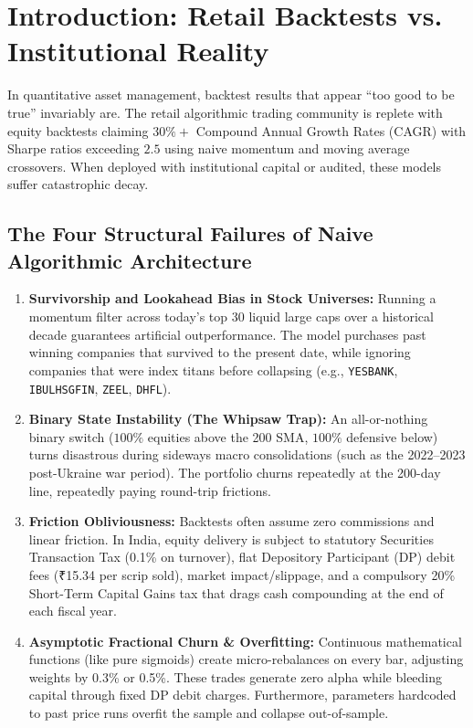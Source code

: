 \documentclass[11pt,a4paper]{article}
\begin{document}
\tableofcontents
\newpage

\section{Introduction: Retail Backtests vs. Institutional Reality}

In quantitative asset management, backtest results that appear ``too good to be true'' invariably are. The retail algorithmic trading community is replete with equity backtests claiming $30\%+$ Compound Annual Growth Rates (CAGR) with Sharpe ratios exceeding $2.5$ using naive momentum and moving average crossovers. When deployed with institutional capital or audited, these models suffer catastrophic decay.

\subsection{The Four Structural Failures of Naive Algorithmic Architecture}
\begin{enumerate}[leftmargin=*]
    \item \textbf{Survivorship and Lookahead Bias in Stock Universes:} Running a momentum filter across today's top 30 liquid large caps over a historical decade guarantees artificial outperformance. The model purchases past winning companies that survived to the present date, while ignoring companies that were index titans before collapsing (e.g., \texttt{YESBANK}, \texttt{IBULHSGFIN}, \texttt{ZEEL}, \texttt{DHFL}).
    \item \textbf{Binary State Instability (The Whipsaw Trap):} An all-or-nothing binary switch ($100\%$ equities above the 200 SMA, $100\%$ defensive below) turns disastrous during sideways macro consolidations (such as the 2022--2023 post-Ukraine war period). The portfolio churns repeatedly at the 200-day line, repeatedly paying round-trip frictions.
    \item \textbf{Friction Obliviousness:} Backtests often assume zero commissions and linear friction. In India, equity delivery is subject to statutory Securities Transaction Tax (0.1\% on turnover), flat Depository Participant (DP) debit fees (₹15.34 per scrip sold), market impact/slippage, and a compulsory 20\% Short-Term Capital Gains tax that drags cash compounding at the end of each fiscal year.
    \item \textbf{Asymptotic Fractional Churn \& Overfitting:} Continuous mathematical functions (like pure sigmoids) create micro-rebalances on every bar, adjusting weights by 0.3\% or 0.5\%. These trades generate zero alpha while bleeding capital through fixed DP debit charges. Furthermore, parameters hardcoded to past price runs overfit the sample and collapse out-of-sample.
\end{enumerate}
\end{document}
